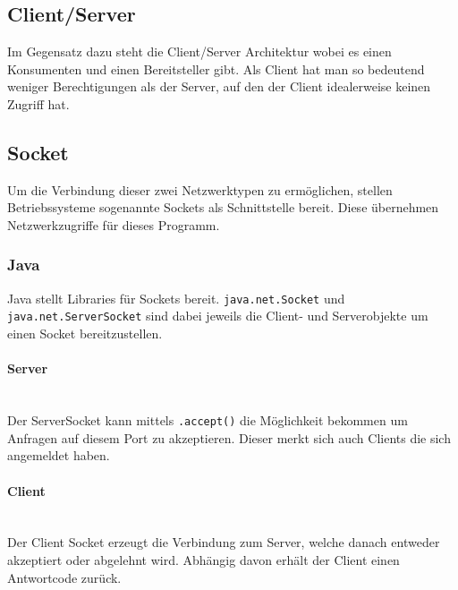 \documentclass{article}
\newcommand{\paragraphlb}[1]{\paragraph{#1}\mbox{}\\}
\begin{document}
	\subsection{Client/Server}
	Im Gegensatz dazu steht die Client/Server Architektur wobei es einen Konsumenten und einen Bereitsteller gibt. Als Client hat man so bedeutend weniger Berechtigungen als der Server, auf den der Client idealerweise keinen Zugriff hat.
	\subsection{Socket}
	Um die Verbindung dieser zwei Netzwerktypen zu ermöglichen, stellen Betriebssysteme sogenannte Sockets als Schnittstelle bereit. Diese übernehmen Netzwerkzugriffe für dieses Programm.
	\subsubsection{Java}
	Java stellt Libraries für Sockets bereit. \texttt{java.net.Socket} und \texttt{java.net.ServerSocket} sind dabei jeweils die Client- und Serverobjekte um einen Socket bereitzustellen.
	\paragraphlb{Server}
	Der ServerSocket kann mittels \texttt{.accept()} die Möglichkeit bekommen um Anfragen auf diesem Port zu akzeptieren. Dieser merkt sich auch Clients die sich angemeldet haben.
	\paragraphlb{Client}
	Der Client Socket erzeugt die Verbindung zum Server, welche danach entweder akzeptiert oder abgelehnt wird. Abhängig davon erhält der Client einen Antwortcode zurück.
\end{document}
